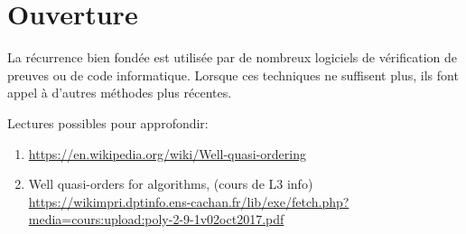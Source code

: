 \documentclass[12pt]{article}
\begin{document}
\section{Ouverture}

La récurrence bien fondée est utilisée par de nombreux logiciels de vérification de preuves ou de code informatique. Lorsque ces techniques ne suffisent plus, ils font appel à d'autres méthodes plus récentes.

Lectures possibles pour approfondir: 
\begin{enumerate}
\item \url{https://en.wikipedia.org/wiki/Well-quasi-ordering}
\item Well quasi-orders for algorithms, (cours de L3 info) \url{https://wikimpri.dptinfo.ens-cachan.fr/lib/exe/fetch.php?media=cours:upload:poly-2-9-1v02oct2017.pdf}
\end{enumerate}
\end{document}
